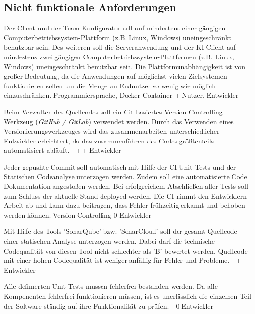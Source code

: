 \subsection{Nicht funktionale Anforderungen}

        {Der Client und der Team-Konfigurator soll auf mindestens einer gängigen Computerbetriebssystem-Plattform (z.B. Linux, Windows) uneingeschränkt benutzbar sein. Des weiteren soll die Serveranwendung und der KI-Client auf mindestens zwei gängigen Computerbetriebssystem-Plattformen (z.B. Linux, Windows) uneingeschränkt benutzbar sein.}
        {Die Plattformunabhängigkeit ist von großer Bedeutung, da die Anwendungen auf möglichst vielen Zielsystemen funktionieren sollen um die Menge an Endnutzer so wenig wie möglich einzuschränken.}
        {Programmiersprache, Docker-Container}
        {+}
        {Nutzer, Entwickler}

        {Beim Verwalten des Quellcodes soll ein Git basiertes Version-Controlling Werkzeug (\textit{GitHub / GitLab}) verwendet werden.}
        {Durch das Verwenden eines Versionierungswerkzeuges wird das zusammenarbeiten unterschiedlicher Entwickler erleichtert, da das zusammenführen des Codes größtenteils automatisiert abläuft.}
        {-}
        {++}
        {Entwickler}

        {Jeder gepushte Commit soll automatisch mit Hilfe der CI Unit-Tests und der Statischen Codeanalyse unterzogen werden. Zudem soll eine automatisierte Code Dokumentation angestoßen werden. Bei erfolgreichem Abschließen aller Tests soll zum Schluss der aktuelle Stand deployed werden.}
        {Die CI nimmt den Entwicklern Arbeit ab und kann dazu beitragen, dass Fehler frühzeitig erkannt und behoben werden können.}
        {Version-Controlling}
        {0}
        {Entwickler}

        {Mit Hilfe des Tools 'SonarQube' bzw. 'SonarCloud' soll der gesamt Quellcode einer statischen Analyse unterzogen werden. Dabei darf die technische Codequalität von diesen Tool nicht schlechter als 'B' bewertet werden.}
        {Quellcode mit einer hohen Codequalität ist weniger anfällig für Fehler und Probleme.}
        {-}
        {+}
        {Entwickler}

        {Alle definierten Unit-Tests müssen fehlerfrei bestanden werden.}
        {Da alle Komponenten fehlerfrei funktionieren müssen, ist es unerlässlich die einzelnen Teil der Software ständig auf ihre Funktionalität zu prüfen.}
        {-}
        {0}
        {Entwickler}

